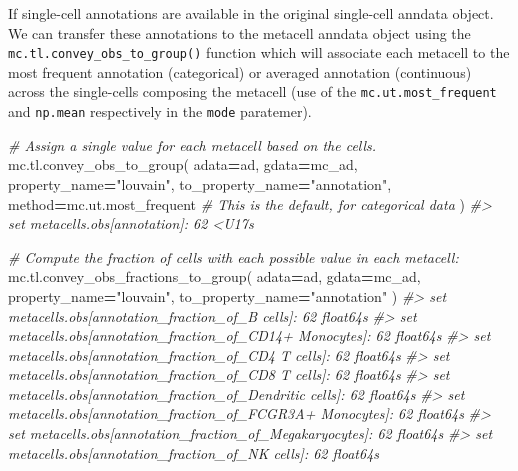 \documentclass[
]{book}
\newenvironment{Shaded}{\begin{snugshade}}{\end{snugshade}}
\newcommand{\CommentTok}[1]{\textcolor[rgb]{0.56,0.35,0.01}{\textit{#1}}}
\newcommand{\NormalTok}[1]{#1}
\newcommand{\OperatorTok}[1]{\textcolor[rgb]{0.81,0.36,0.00}{\textbf{#1}}}
\newcommand{\StringTok}[1]{\textcolor[rgb]{0.31,0.60,0.02}{#1}}
\begin{document}
If single-cell annotations are available in the original single-cell anndata object. We can transfer these annotations to the metacell anndata object
using the \texttt{mc.tl.convey\_obs\_to\_group()} function which will associate each metacell to the most frequent annotation (categorical) or averaged annotation (continuous) across the single-cells composing the metacell
(use of the \texttt{mc.ut.most\_frequent} and \texttt{np.mean} respectively in the \texttt{mode} paratemer).

\begin{Shaded}
\begin{Highlighting}[]
\CommentTok{\# Assign a single value for each metacell based on the cells.}
\NormalTok{mc.tl.convey\_obs\_to\_group(}
\NormalTok{    adata}\OperatorTok{=}\NormalTok{ad, gdata}\OperatorTok{=}\NormalTok{mc\_ad,}
\NormalTok{    property\_name}\OperatorTok{=}\StringTok{"louvain"}\NormalTok{, to\_property\_name}\OperatorTok{=}\StringTok{"annotation"}\NormalTok{,}
\NormalTok{    method}\OperatorTok{=}\NormalTok{mc.ut.most\_frequent  }\CommentTok{\# This is the default, for categorical data}
\NormalTok{)}
\CommentTok{\#\textgreater{} set metacells.obs[annotation]: 62 \textless{}U17s}

\CommentTok{\# Compute the fraction of cells with each possible value in each metacell:}
\NormalTok{mc.tl.convey\_obs\_fractions\_to\_group(  }
\NormalTok{    adata}\OperatorTok{=}\NormalTok{ad, gdata}\OperatorTok{=}\NormalTok{mc\_ad,}
\NormalTok{    property\_name}\OperatorTok{=}\StringTok{"louvain"}\NormalTok{, to\_property\_name}\OperatorTok{=}\StringTok{"annotation"}
\NormalTok{)}
\CommentTok{\#\textgreater{} set metacells.obs[annotation\_fraction\_of\_B cells]: 62 float64s}
\CommentTok{\#\textgreater{} set metacells.obs[annotation\_fraction\_of\_CD14+ Monocytes]: 62 float64s}
\CommentTok{\#\textgreater{} set metacells.obs[annotation\_fraction\_of\_CD4 T cells]: 62 float64s}
\CommentTok{\#\textgreater{} set metacells.obs[annotation\_fraction\_of\_CD8 T cells]: 62 float64s}
\CommentTok{\#\textgreater{} set metacells.obs[annotation\_fraction\_of\_Dendritic cells]: 62 float64s}
\CommentTok{\#\textgreater{} set metacells.obs[annotation\_fraction\_of\_FCGR3A+ Monocytes]: 62 float64s}
\CommentTok{\#\textgreater{} set metacells.obs[annotation\_fraction\_of\_Megakaryocytes]: 62 float64s}
\CommentTok{\#\textgreater{} set metacells.obs[annotation\_fraction\_of\_NK cells]: 62 float64s}
\end{Highlighting}
\end{Shaded}
\end{document}
